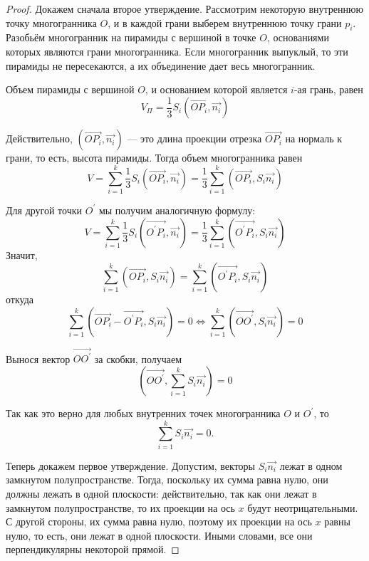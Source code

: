 \begin{proof}
    Докажем сначала второе утверждение. Рассмотрим некоторую внутреннюю точку многогранника $O$, и в каждой грани выберем внутреннюю точку грани $p_i$. Разобьём многогранник на пирамиды с вершиной в точке $O$, основаниями которых являются грани многогранника. Если многогранник выпуклый, то эти пирамиды не пересекаются, а их объединение дает весь многогранник.

    Объем пирамиды с вершиной $O$, и основанием которой является $i$-ая грань, равен
    $$V_{\Pi}=\frac{1}{3} S_i\left(\overrightarrow{O P_i}, \overrightarrow{n_i}\right)$$

    Действительно, $\left(\overrightarrow{O P_i}, \overrightarrow{n_i}\right)$ — это длина проекции отрезка $\overrightarrow{O P_i}$ на нормаль к грани, то есть, высота пирамиды. Тогда объем многогранника равен
    $$V=\sum_{i=1}^k \frac{1}{3} S_i\left(\overrightarrow{O P_i}, \overrightarrow{n_i}\right)=\frac{1}{3} \sum_{i=1}^k\left(\overrightarrow{O P_i}, S_i \overrightarrow{n_i}\right)$$

    Для другой точки $O^{\prime}$ мы получим аналогичную формулу:
    $$V=\sum_{i=1}^k \frac{1}{3} S_i\left(\overrightarrow{O^{\prime} P_i}, \overrightarrow{n_i}\right)=\frac{1}{3} \sum_{i=1}^k\left(\overrightarrow{O^{\prime} P_i}, S_i \overrightarrow{n_i}\right)$$
    Значит,
    $$\sum_{i=1}^k\left(\overrightarrow{O P_i}, S_i \overrightarrow{n_i}\right)=\sum_{i=1}^k\left(\overrightarrow{O^{\prime} P_i}, S_i \overrightarrow{n_i}\right)$$
    откуда
    $$\sum_{i=1}^k\left(\overrightarrow{O P_i}-\overrightarrow{O^{\prime} P_i}, S_i \overrightarrow{n_i}\right)=0 \Longleftrightarrow \sum_{i=1}^k\left(\overrightarrow{O O^{\prime}}, S_i \overrightarrow{n_i}\right)=0$$

    Вынося вектор $\overrightarrow{O O^{\prime}}$ за скобки, получаем
    $$\left(\overrightarrow{O O^{\prime}}, \sum_{i=1}^k S_i \overrightarrow{n_i}\right)=0$$

    Так как это верно для любых внутренних точек многогранника $O$ и $O^{\prime}$, то
    $$\sum_{i=1}^{k} S_i \overrightarrow{n_i} = 0.$$

    Теперь докажем первое утверждение. Допустим, векторы $S_i \overrightarrow{n_i}$ лежат в одном замкнутом полупространстве. Тогда, поскольку их сумма равна нулю, они должны лежать в одной плоскости: действительно, так как они лежат в замкнутом полупространстве, то их проекции на ось $x$ будут неотрицательными. С другой стороны, их сумма равна нулю, поэтому их проекции на ось $x$ равны нулю, то есть, они лежат в одной плоскости. Иными словами, все они перпендикулярны некоторой прямой.


\end{proof}
